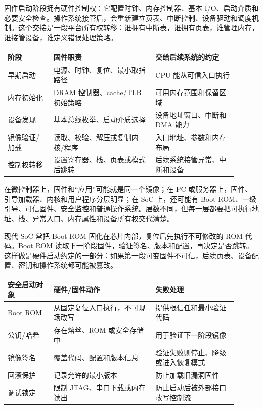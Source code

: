 固件启动阶段拥有硬件控制权：它配置时钟、内存控制器、基本 I/O、启动介质和必要安全检查。操作系统接管后，会重新建立页表、中断控制、设备驱动和调度机制。这个交接是一段平台所有权转移：谁拥有中断表，谁拥有页表，谁管理内存，谁接管设备，谁定义错误处理策略。

\begin{longtable}{L{0.18\linewidth}L{0.4\linewidth}L{0.32\linewidth}}
\toprule
阶段 & 固件职责 & 交给后续系统的约定 \\
\midrule
早期启动 & 电源、时钟、复位、最小取指路径 & CPU 能从可信入口执行 \\\tablerowrule
内存初始化 & DRAM 控制器、cache/TLB 初始策略 & 可用内存范围和保留区域 \\\tablerowrule
设备发现 & 基本总线枚举、启动介质选择 & 设备地址窗口、中断和 DMA 能力 \\\tablerowrule
镜像验证/加载 & 读取、校验、解压或复制内核/程序 & 入口地址、参数和内存布局 \\\tablerowrule
控制权转移 & 设置寄存器、栈、页表或模式后跳转 & 后续系统接管异常、中断和设备 \\
\bottomrule
\end{longtable}

在微控制器上，固件和“应用”可能就是同一个镜像；在 PC 或服务器上，固件、引导加载器、内核和用户程序分层明显；在 SoC 上，还可能有 Boot ROM、一级引导、可信固件、安全监控和普通操作系统。层数不同，但每一层都要把可执行地址、栈、异常入口、内存属性和设备所有权交代清楚。

现代 SoC 常把 Boot ROM 固化在芯片内部，复位后先执行不可修改的 ROM 代码。Boot ROM 读取下一阶段固件，验证签名、版本和配置，再决定是否跳转。这样做是硬件启动约定的一部分：如果第一段可变固件不可信，后续页表、设备配置、密钥和操作系统都可能被篡改。

\begin{longtable}{L{0.18\linewidth}L{0.4\linewidth}L{0.32\linewidth}}
\toprule
安全启动对象 & 硬件/固件动作 & 失败处理 \\
\midrule
Boot ROM & 从固定复位入口执行，不可现场改写 & 提供根信任和最小验证代码 \\\tablerowrule
公钥/哈希 & 存在熔丝、ROM 或安全存储中 & 用于验证下一阶段镜像 \\\tablerowrule
镜像签名 & 覆盖代码、配置和版本信息 & 验证失败则停止、降级或进入恢复模式 \\\tablerowrule
回滚保护 & 记录允许的最小版本 & 防止加载旧漏洞固件 \\\tablerowrule
调试锁定 & 限制 JTAG、串口下载或内存读出 & 防止启动后被外部接口改写控制流 \\
\bottomrule
\end{longtable}

